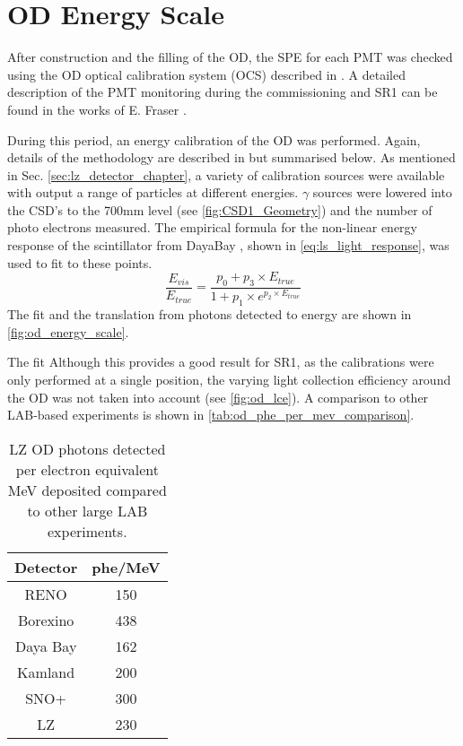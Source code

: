 \section{OD Energy Scale} \label{sec:od_energy_scale}
\par
After construction and the filling of the OD, the SPE for each PMT was checked using the OD optical calibration system (OCS) described in \cite{lz_ocs_system_ref}.
A detailed description of the PMT monitoring during the commissioning and SR1 can be found in the works of E. Fraser \cite{ewanfraser_thesis_ref}. 
\par
During this period, an energy calibration of the OD was performed.
Again, details of the methodology are described in \cite{ewanfraser_thesis_ref} but summarised below.
As mentioned in Sec. \ref{sec:lz_detector_chapter}, a variety of calibration sources were available with output a range of particles at different energies.
$\gamma$ sources were lowered into the CSD's to the 700mm level (see \autoref{fig:CSD1_Geometry}) and the number of photo electrons measured.
The empirical formula for the non-linear energy response of the scintillator from DayaBay \cite{dayabay_antineutrino_oscillation_ref, ls_nonlinear_energy_response_ref}, shown in \autoref{eq:ls_light_response}, was used to fit to these points.
\begin{equation}
    \frac{E_{vis}}{E_{true}} = \frac{p_0  + p_3 \times E_{true}}{1 + p_1 \times e^{p_2 \times E_{true}}}
    \label{eq:ls_light_response}
\end{equation}
The fit and the translation from photons detected to energy are shown in \autoref{fig:od_energy_scale}.



\par
The fit 
Although this provides a good result for SR1, as the calibrations were only performed at a single position, the varying light collection efficiency around the OD was not taken into account (see \autoref{fig:od_lce}).
A comparison to other LAB-based experiments is shown in \autoref{tab:od_phe_per_mev_comparison}.

\begin{table}[!htbp]%
    \centering
    \begin{tabular}{c|c}
        Detector & phe/MeV \\ \hline
        RENO     & 150 \cite{reno_phe_per_mev_ref} \\
        Borexino & 438 \cite{pablo_mosteiro_thesis_ref} \\
        Daya Bay & 162 \cite{dayabay_phe_per_mev_ref} \\
        Kamland  & 200 \cite{kamland_phe_per_mev_ref} \\
        SNO+     & 300 \cite{snoplus_phe_per_mev_ref} \\
        LZ       & 230 
    \end{tabular}
    \caption{LZ OD photons detected per electron equivalent MeV deposited compared to other large LAB experiments.}
    \label{tab:od_phe_per_mev_comparison}
\end{table}

